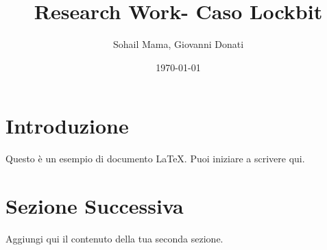 \documentclass{article}
\title{Research Work- Caso Lockbit}
\author{Sohail Mama, Giovanni Donati}
\date{\today}
\begin{document}
\maketitle

\section{Introduzione}
Questo è un esempio di documento LaTeX. Puoi iniziare a scrivere qui.

\section{Sezione Successiva}
Aggiungi qui il contenuto della tua seconda sezione.
\end{document}
